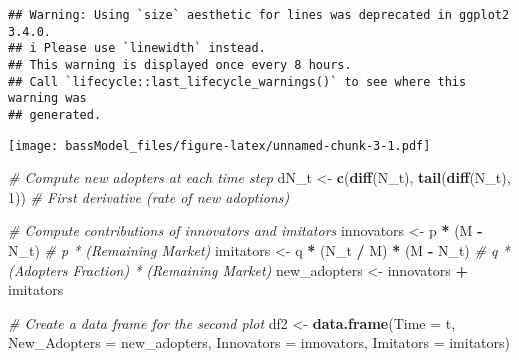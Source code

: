 \documentclass[
]{article}
\newenvironment{Shaded}{\begin{snugshade}}{\end{snugshade}}
\newcommand{\AttributeTok}[1]{\textcolor[rgb]{0.13,0.29,0.53}{#1}}
\newcommand{\CommentTok}[1]{\textcolor[rgb]{0.56,0.35,0.01}{\textit{#1}}}
\newcommand{\DecValTok}[1]{\textcolor[rgb]{0.00,0.00,0.81}{#1}}
\newcommand{\FunctionTok}[1]{\textcolor[rgb]{0.13,0.29,0.53}{\textbf{#1}}}
\newcommand{\NormalTok}[1]{#1}
\newcommand{\OtherTok}[1]{\textcolor[rgb]{0.56,0.35,0.01}{#1}}
\newcommand{\SpecialCharTok}[1]{\textcolor[rgb]{0.81,0.36,0.00}{\textbf{#1}}}
\begin{document}
\begin{verbatim}
## Warning: Using `size` aesthetic for lines was deprecated in ggplot2 3.4.0.
## i Please use `linewidth` instead.
## This warning is displayed once every 8 hours.
## Call `lifecycle::last_lifecycle_warnings()` to see where this warning was
## generated.
\end{verbatim}

\texttt{[image: bassModel\_files/figure-latex/unnamed-chunk-3-1.pdf]}

\begin{Shaded}
\begin{Highlighting}[]
\CommentTok{\# Compute new adopters at each time step}
\NormalTok{dN\_t }\OtherTok{\textless{}{-}} \FunctionTok{c}\NormalTok{(}\FunctionTok{diff}\NormalTok{(N\_t), }\FunctionTok{tail}\NormalTok{(}\FunctionTok{diff}\NormalTok{(N\_t), }\DecValTok{1}\NormalTok{))  }\CommentTok{\# First derivative (rate of new adoptions)}

\CommentTok{\# Compute contributions of innovators and imitators}
\NormalTok{innovators }\OtherTok{\textless{}{-}}\NormalTok{ p }\SpecialCharTok{*}\NormalTok{ (M }\SpecialCharTok{{-}}\NormalTok{ N\_t)  }\CommentTok{\# p * (Remaining Market)}
\NormalTok{imitators }\OtherTok{\textless{}{-}}\NormalTok{ q }\SpecialCharTok{*}\NormalTok{ (N\_t }\SpecialCharTok{/}\NormalTok{ M) }\SpecialCharTok{*}\NormalTok{ (M }\SpecialCharTok{{-}}\NormalTok{ N\_t)  }\CommentTok{\# q * (Adopters Fraction) * (Remaining Market)}
\NormalTok{new\_adopters }\OtherTok{\textless{}{-}}\NormalTok{ innovators }\SpecialCharTok{+}\NormalTok{ imitators}

\CommentTok{\# Create a data frame for the second plot}
\NormalTok{df2 }\OtherTok{\textless{}{-}} \FunctionTok{data.frame}\NormalTok{(}\AttributeTok{Time =}\NormalTok{ t, }\AttributeTok{New\_Adopters =}\NormalTok{ new\_adopters, }\AttributeTok{Innovators =}\NormalTok{ innovators, }\AttributeTok{Imitators =}\NormalTok{ imitators)}


\end{Highlighting}
\end{Shaded}
\end{document}
